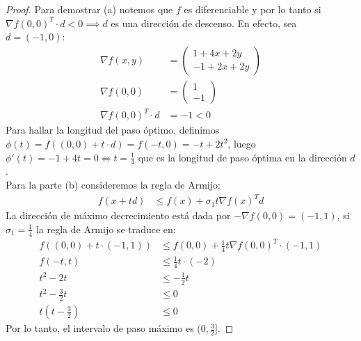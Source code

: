 \documentclass{article}
\begin{document}
\begin{proof}
    Para demostrar (a) notemos que \( f \) es diferenciable y por lo tanto si \( {\nabla f(0,0)}^T \cdot d < 0 \implies d \) es una dirección de descenso. En efecto,
    sea \( d = (-1, 0) \): \begin{align*}
        \nabla{f(x,y)}            & = \begin{pmatrix}
                                          1 + 4x + 2y \\
                                          -1 + 2x + 2y
                                      \end{pmatrix} \\
        \nabla{f(0,0)}            & = \begin{pmatrix}
                                          1 \\
                                          -1
                                      \end{pmatrix} \\
        {\nabla f(0,0)}^T \cdot d & = -1 < 0
    \end{align*}
    Para hallar la longitud del paso óptimo, definimos \( \phi(t) = f((0,0) + t \cdot d) = f(-t, 0) = -t + 2t^2 \), luego \( \phi'(t) = -1 + 4t = 0 \iff t = \frac{1}{4} \) que es la longitud de paso óptima en la dirección \( d \). \\
    Para la parte (b) consideremos la regla de Armijo: \begin{align*}
        f(x + t d) & \leq f(x) + \sigma_1 t {\nabla f(x)}^T d
    \end{align*}
    La dirección de máximo decrecimiento está dada por \( - \nabla f(0,0) = (-1, 1) \), si \( \sigma_1 = \frac{1}{4} \) la regla de Armijo se traduce en: \begin{align*}
        f((0,0) + t \cdot (-1, 1)) & \leq f(0, 0) + \frac{1}{4} t {\nabla f(0,0)}^T \cdot (-1, 1) \\
        f(-t, t)                   & \leq \frac{1}{4} t \cdot (-2)                                \\
        t^2 - 2t                   & \leq -\frac{1}{2} t                                          \\
        t^2 - \frac{3}{2} t        & \leq 0                                                       \\
        t(t - \frac{3}{2})         & \leq 0
    \end{align*}
    Por lo tanto, el intervalo de paso máximo es \( (0, \frac{3}{2}] \).
\end{proof}
\end{document}
